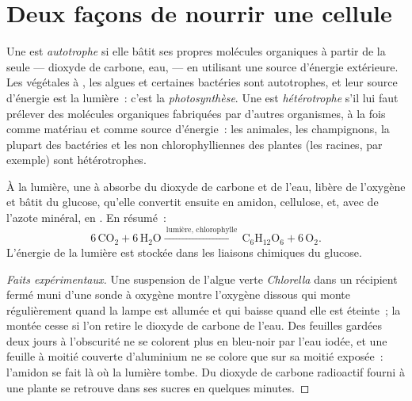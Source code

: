 \section{Deux façons de nourrir une cellule}

\begin{definition}\label{def:g10:cell-metabolism:autotrophy}
Une  est \emph{autotrophe} si elle bâtit ses
propres molécules organiques à partir de la seule  ---
dioxyde de carbone, eau,  --- en utilisant une source
d'énergie extérieure. Les  végétales à , les
algues et certaines bactéries sont autotrophes, et leur source
d'énergie est la lumière~: c'est la
\emph{photosynthèse}. Une  est
\emph{hétérotrophe} s'il lui faut prélever des
molécules organiques fabriquées par d'autres organismes, à la fois
comme matériau et comme source d'énergie~: les  animales, les
champignons, la plupart des bactéries et les  non
chlorophylliennes des plantes (les racines, par exemple) sont
hétérotrophes.
\end{definition}

\begin{proposition}[La photosynthèse]\label{prop:g10:cell-metabolism:photosynthesis}
À la lumière, une  à  absorbe du dioxyde de carbone
et de l'eau, libère de l'oxygène et bâtit du glucose, qu'elle convertit
ensuite en amidon, cellulose,  et, avec de l'azote minéral, en
. En résumé~:
\[
6\,\mathrm{CO_2} + 6\,\mathrm{H_2O} \xrightarrow{\ \text{lumière, chlorophylle}\ }
\mathrm{C_6H_{12}O_6} + 6\,\mathrm{O_2}.
\]
L'énergie de la lumière est stockée dans les liaisons chimiques du glucose.
\end{proposition}
\begin{proof}[Faits expérimentaux]
Une suspension de l'algue verte \emph{Chlorella} dans un récipient
fermé muni d'une sonde à oxygène montre l'oxygène dissous qui monte
régulièrement quand la lampe est allumée et qui baisse quand elle est
éteinte~; la montée cesse si l'on retire le dioxyde de carbone de
l'eau. Des feuilles gardées deux jours à l'obscurité ne se colorent
plus en bleu-noir par l'eau iodée, et une feuille à moitié couverte
d'aluminium ne se colore que sur sa moitié exposée~: l'amidon se fait
là où la lumière tombe. Du dioxyde de carbone radioactif fourni à une
plante se retrouve dans ses sucres en quelques minutes.
\end{proof}

